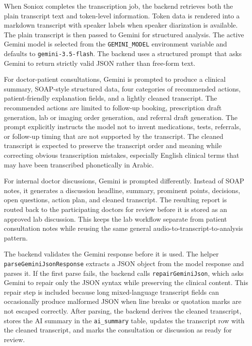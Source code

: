 When Soniox completes the transcription job, the backend retrieves both the plain transcript text and token-level information. Token data is rendered into a markdown transcript with speaker labels when speaker diarization is available. The plain transcript is then passed to Gemini for structured analysis. The active Gemini model is selected from the \texttt{GEMINI\_MODEL} environment variable and defaults to \texttt{gemini-3.5-flash}. The backend uses a structured prompt that asks Gemini to return strictly valid JSON rather than free-form text.

For doctor-patient consultations, Gemini is prompted to produce a clinical summary, SOAP-style structured data, four categories of recommended actions, patient-friendly explanation fields, and a lightly cleaned transcript. The recommended actions are limited to follow-up booking, prescription draft generation, lab or imaging order generation, and referral draft generation. The prompt explicitly instructs the model not to invent medications, tests, referrals, or follow-up timing that are not supported by the transcript. The cleaned transcript is expected to preserve the transcript order and meaning while correcting obvious transcription mistakes, especially English clinical terms that may have been transcribed phonetically in Arabic.

For internal doctor discussions, Gemini is prompted differently. Instead of SOAP notes, it generates a discussion headline, summary, prominent points, decisions, open questions, action plan, and cleaned transcript. The resulting report is routed back to the participating doctors for review before it is stored as an approved lab discussion. This keeps the lab workflow separate from patient consultation notes while reusing the same general audio-to-transcript-to-analysis pattern.

The backend validates the Gemini response before it is used. The helper \texttt{parseGeminiJsonResponse} extracts a JSON object from the model response and parses it. If the first parse fails, the backend calls \texttt{repairGeminiJson}, which asks Gemini to repair only the JSON syntax while preserving the clinical content. This repair step is included because long mixed-language transcript fields can occasionally produce malformed JSON when line breaks or quotation marks are not escaped correctly. After parsing, the backend derives the cleaned transcript, stores the AI summary in the \texttt{ai\_summary} table, updates the transcript row with the cleaned transcript, and marks the consultation or discussion as ready for review.

